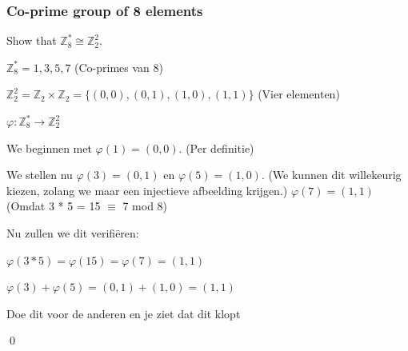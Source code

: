 \subsubsection{Co-prime group of 8 elements}

Show that \(\mathds{Z}_8^* \cong \mathds{Z}_2^2\).


\(\mathds{Z}_8^* = {1,3,5,7}\) (Co-primes van 8)

\(\mathds{Z}_2^2 = \mathds{Z}_2 \times \mathds{Z}_2 = \{(0,0), (0,1), (1,0), (1,1)\}\) (Vier elementen)

\(\varphi: \mathds{Z}_8^* \to \mathds{Z}_2^2\)

We beginnen met \(\varphi(1) = (0,0)\). (Per definitie)

We stellen nu \(\varphi(3) = (0,1)\) en \(\varphi(5) = (1,0)\). (We kunnen dit willekeurig kiezen, zolang we maar een injectieve afbeelding krijgen.)
\(\varphi(7) = (1,1)\) (Omdat 3 * 5 = 15 \(\equiv\) 7 mod 8)

Nu zullen we dit verifiëren:

\(
\varphi(3 * 5) = \varphi(15) = \varphi(7) = (1,1)
\)

\(\varphi(3) + \varphi(5) = (0,1) + (1,0) = (1,1)\)     

Doe dit voor de anderen en je ziet dat dit klopt

\qed

